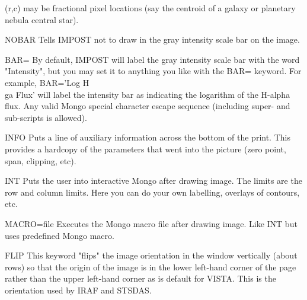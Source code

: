{\begin{example}
{          (r,c) may be fractional pixel locations (say the centroid of
          a galaxy or planetary nebula central star).}
  \item[NOBAR]{Tells IMPOST not to draw in the gray intensity scale bar
          on the image. }
  \item[BAR=]{By default, IMPOST will label the gray intensity scale
          bar with the word "Intensity", but you may set it to 
          anything you like with the BAR= keyword.  For example,
          BAR='Log H\\ga Flux' will label the intensity bar as
          indicating the logarithm of the H-alpha flux.  Any valid
          Mongo special character escape sequence (including 
          super- and sub-scripts is allowed).}
  \item[INFO]{Puts a line of auxiliary information across the bottom of
          the print.  This provides a hardcopy of the parameters
          that went into the picture (zero point, span, clipping, etc).}
  \item[INT]{Puts the user into interactive Mongo after drawing image. The
          limits are the row and column limits. Here you can do your
          own labelling, overlays of contours, etc.}
  \item[MACRO=file]{Executes the Mongo macro file after drawing image. Like
          INT but uses predefined Mongo macro.}
  \item[FLIP]{This keyword "flips" the image orientation in the window
          vertically (about rows) so that the origin of the image is
          in the lower left-hand corner of the page rather than the
          upper left-hand corner as is default for VISTA.  This is
          the orientation used by IRAF and STSDAS.}
\end{example}%
\lthtmlfigureZ
\lthtmlcheckvsize\clearpage}

